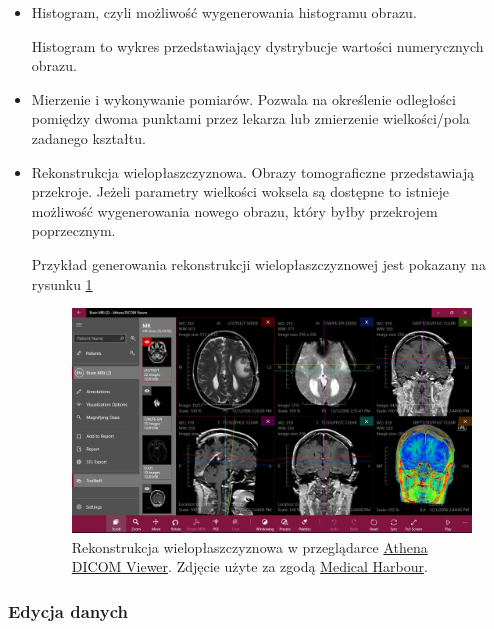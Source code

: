 \begin{itemize}
    \item Histogram, czyli możliwość wygenerowania histogramu obrazu.

          Histogram to wykres przedstawiający dystrybucje wartości numerycznych obrazu.

    \item Mierzenie i wykonywanie pomiarów.
          Pozwala na określenie odległości pomiędzy dwoma punktami przez lekarza lub zmierzenie wielkości/pola zadanego kształtu.

    \item Rekonstrukcja wielopłaszczyznowa.
          Obrazy tomograficzne przedstawiają przekroje.
          Jeżeli parametry wielkości woksela są dostępne to istnieje możliwość wygenerowania nowego obrazu, który byłby przekrojem poprzecznym.

          Przykład generowania rekonstrukcji wielopłaszczyznowej jest pokazany na rysunku \ref{fig:dicomviewer003}

          \begin{figure}[!htbp]
              \centering
              \includegraphics[width=\textwidth]{img/dicom-viewer-003.jpeg}
              \caption{Rekonstrukcja wielopłaszczyznowa w przeglądarce \href{https://athenadicomviewer.com/}{Athena DICOM Viewer}. Zdjęcie użyte za zgodą \href{https://medicalharbour.com/}{Medical Harbour}.}
              \label{fig:dicomviewer003}
          \end{figure}
\end{itemize}

\subsubsection{Edycja danych}

